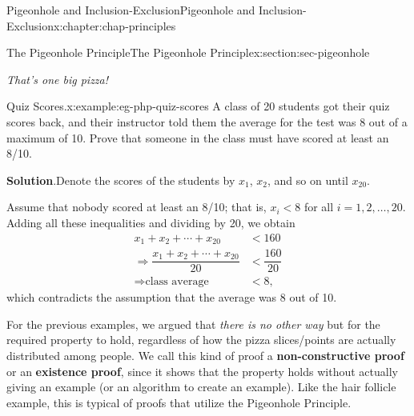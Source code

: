 \documentclass[oneside,10pt,]{book}
\newcommand{\blocktitlefont}{\relax}
\newcommand{\terminology}[1]{\textbf{#1}}
\numberwithin{equation}{section}
\newcommand{\lt}{<}
\newcommand{\amp}{&}
\begin{document}
\begin{chapterptx}{Pigeonhole and Inclusion-Exclusion}{}{Pigeonhole and Inclusion-Exclusion}{}{}{x:chapter:chap-principles}
\begin{sectionptx}{The Pigeonhole Principle}{}{The Pigeonhole Principle}{}{}{x:section:sec-pigeonhole}
\begin{sidebyside}{1}{0.325}{0.325}{0}
\begin{sbspanel}{0.35}
{
}%
\end{sbspanel}%
\end{sidebyside}%
\begin{sidebyside}{1}{0.365}{0.365}{0}%
\begin{sbspanel}{0.27}%
\emph{That's one big pizza!}%
\end{sbspanel}%
\end{sidebyside}%
\begin{example}{Quiz Scores.}{x:example:eg-php-quiz-scores}%
A class of 20 students got their quiz scores back, and their instructor told them the average for the test was 8 out of a maximum of 10. Prove that someone in the class must have scored at least an 8\slash{}10.%
\par\smallskip%
\noindent\textbf{\blocktitlefont Solution}.\hypertarget{g:solution:id529475}{}\quad{}Denote the scores of the students by \(x_1\), \(x_2\), and so on until \(x_{20}\).%
\par
Assume that nobody scored at least an 8\slash{}10; that is, \(x_i \lt 8\) for all \(i = 1,2,\ldots, 20\). Adding all these inequalities and dividing by 20, we obtain%
\begin{align*}
x_1 + x_2 + \cdots + x_{20} \amp \lt 160\\
\Rightarrow \dfrac{x_1+x_2+\cdots+x_{20}}{20} \amp \lt \dfrac{160}{20}\\
\Rightarrow \text{class average } \amp \lt 8\text{,}
\end{align*}
which contradicts the assumption that the average was 8 out of 10.%
\end{example}
For the previous examples, we argued that \emph{there is no other way} but for the required property to hold, regardless of how the pizza slices\slash{}points are actually distributed among people. We call this kind of proof a \terminology{non-constructive proof} or an \terminology{existence proof}, since it shows that the property holds without actually giving an example (or an algorithm to create an example). Like the hair follicle example, this is typical of proofs that utilize the Pigeonhole Principle.%
\begin{sidebyside}{1}{0}{0}{0}%

\end{sidebyside}
\end{sectionptx}
\end{chapterptx}
\end{document}
